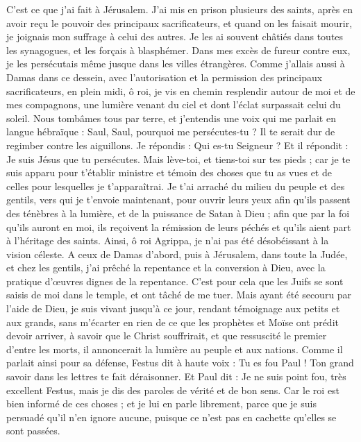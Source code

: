 \begin{multicols}{2}
C’est ce que j’ai fait à Jérusalem. J’ai mis en prison plusieurs des saints, après en avoir reçu le pouvoir des principaux sacrificateurs, et quand on les faisait mourir, je joignais mon suffrage à celui des autres.
Je les ai souvent châtiés dans toutes les synagogues, et les forçais à blasphémer. Dans mes excès de fureur contre eux, je les persécutais même jusque dans les villes étrangères.
Comme j'allais aussi à Damas dans ce dessein, avec l’autorisation et la permission des principaux sacrificateurs,
en plein midi, ô roi, je vis en chemin resplendir autour de moi et de mes compagnons, une lumière venant du ciel et dont l’éclat surpassait celui du soleil.
Nous tombâmes tous par terre, et j’entendis une voix qui me parlait en langue hébraïque : Saul, Saul, pourquoi me persécutes-tu ? Il te serait dur de regimber contre les aiguillons.
Je répondis : Qui es-tu Seigneur ? Et il répondit : Je suis Jésus que tu persécutes.
Mais lève-toi, et tiens-toi sur tes pieds ; car je te suis apparu pour t'établir ministre et témoin des choses que tu as vues et de celles pour lesquelles je t'apparaîtrai.
Je t’ai arraché du milieu du peuple et des gentils, vers qui je t'envoie maintenant,
pour ouvrir leurs yeux afin qu'ils passent des ténèbres à la lumière, et de la puissance de Satan à Dieu ; afin que par la foi qu’ils auront en moi, ils reçoivent la rémission de leurs péchés et qu’ils aient part à l’héritage des saints.
Ainsi, ô roi Agrippa, je n’ai pas été désobéissant à la vision céleste.
A ceux de Damas d’abord, puis à Jérusalem, dans toute la Judée, et chez les gentils, j’ai prêché la repentance et la conversion à Dieu, avec la pratique d’œuvres dignes de la repentance.
C'est pour cela que les Juifs se sont saisis de moi dans le temple, et ont tâché de me tuer.
Mais ayant été secouru par l'aide de Dieu, je suis vivant jusqu'à ce jour, rendant témoignage aux petits et aux grands, sans m’écarter en rien de ce que les prophètes et Moïse ont prédit devoir arriver,
à savoir que le Christ souffrirait, et que ressuscité le premier d’entre les morts, il annoncerait la lumière au peuple et aux nations.
Comme il parlait ainsi pour sa défense, Festus dit à haute voix : Tu es fou Paul ! Ton grand savoir dans les lettres te fait déraisonner.
Et Paul dit : Je ne suis point fou, très excellent Festus, mais je dis des paroles de vérité et de bon sens.
Car le roi est bien informé de ces choses ; et je lui en parle librement, parce que je suis persuadé qu'il n’en ignore aucune, puisque ce n’est pas en cachette qu’elles se sont passées.

\end{multicols}
